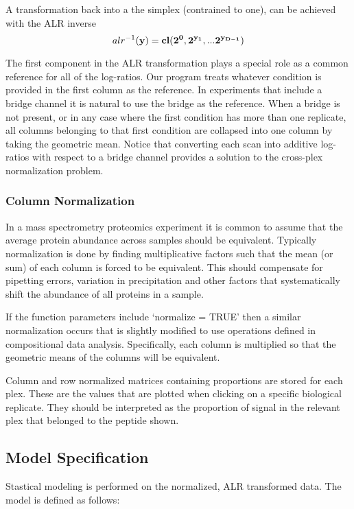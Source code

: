\documentclass[]{article}
\begin{document}
A transformation back into a the simplex (contrained to one), can be
achieved with the ALR inverse \[
alr^{-1}(\bf{y}) = cl(2^{0}, 2^{y_{1}}, ... 2^{y_{D-1}})
\]

The first component in the ALR transformation plays a special role as a
common reference for all of the log-ratios. Our program treats whatever
condition is provided in the first column as the reference. In
experiments that include a bridge channel it is natural to use the
bridge as the reference. When a bridge is not present, or in any case
where the first condition has more than one replicate, all columns
belonging to that first condition are collapsed into one column by
taking the geometric mean. Notice that converting each scan into
additive log-ratios with respect to a bridge channel provides a solution
to the cross-plex normalization problem.

\subsubsection{Column Normalization}\label{column-normalization}

In a mass spectrometry proteomics experiment it is common to assume that
the average protein abundance across samples should be equivalent.
Typically normalization is done by finding multiplicative factors such
that the mean (or sum) of each column is forced to be equivalent. This
should compensate for pipetting errors, variation in precipitation and
other factors that systematically shift the abundance of all proteins in
a sample.

If the function parameters include `normalize = TRUE' then a similar
normalization occurs that is slightly modified to use operations defined
in compositional data analysis. Specifically, each column is multiplied
so that the geometric means of the columns will be equivalent.

Column and row normalized matrices containing proportions are stored for
each plex. These are the values that are plotted when clicking on a
specific biological replicate. They should be interpreted as the
proportion of signal in the relevant plex that belonged to the peptide
shown.

\subsection{Model Specification}\label{model-specification}

Stastical modeling is performed on the normalized, ALR transformed data.
The model is defined as follows:
\end{document}
